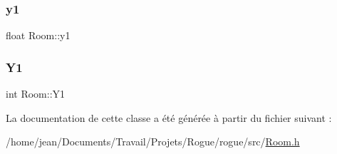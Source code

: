 \subsubsection{\texorpdfstring{y1}{y1}}
{\footnotesize\ttfamily float Room\+::y1}

\mbox{\label{classRoom_a0f689986e4bb0c1074397d4ca32fcd9a}} 
\subsubsection{\texorpdfstring{Y1}{Y1}}
{\footnotesize\ttfamily int Room\+::\+Y1}



La documentation de cette classe a été générée à partir du fichier suivant \+:\begin{DoxyCompactItemize}
\item 
/home/jean/\+Documents/\+Travail/\+Projets/\+Rogue/rogue/src/\hyperlink{Room_8h}{Room.\+h}\end{DoxyCompactItemize}
